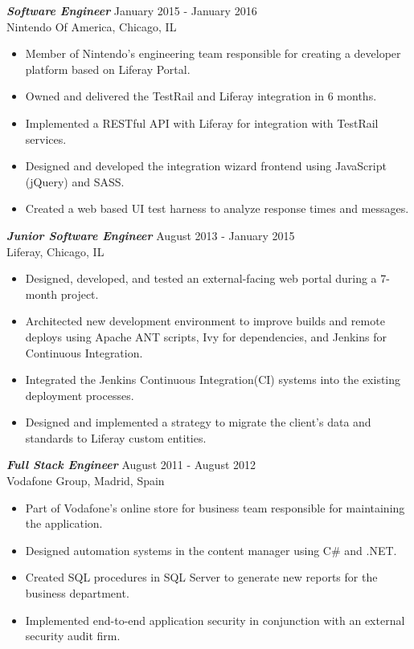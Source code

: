 \documentclass[overlapped, 10pt]{res} %
\begin{document}
\begin{resume}
{\sl \textbf{Software Engineer}} \hfill January 2015 - January 2016 \\
Nintendo Of America, Chicago, IL
\begin{itemize} \itemsep -1pt %
\item Member of Nintendo’s engineering team responsible for creating a developer platform based on Liferay Portal.
\item Owned and delivered the TestRail and Liferay integration in 6 months.
\item Implemented a RESTful API with Liferay for integration with TestRail services.
\item Designed and developed the integration wizard frontend using JavaScript (jQuery) and SASS.
\item Created a web based UI test harness to analyze response times and messages.
\end{itemize} 

{\sl \textbf{Junior Software Engineer}} \hfill August 2013 - January 2015 \\
Liferay, Chicago, IL
\begin{itemize} \itemsep -1pt %
\item Designed, developed, and tested an external-facing web portal during a 7-month project.
\item Architected new development environment to improve builds and remote deploys using Apache ANT scripts, Ivy for dependencies, and Jenkins for Continuous Integration.
\item Integrated the Jenkins Continuous Integration(CI) systems into the existing deployment processes.
\item Designed and implemented a strategy to migrate the client’s data and standards to Liferay custom entities.
\end{itemize} 

{\sl \textbf{Full Stack Engineer}} \hfill August 2011 - August 2012 \\
Vodafone Group, Madrid, Spain
\begin{itemize} \itemsep -1pt %
\item Part of Vodafone’s online store for business team responsible for maintaining the application.
\item Designed automation systems in the content manager using C\# and .NET.
\item Created SQL procedures in SQL Server to generate new reports for the business department.
\item Implemented end-to-end application security in conjunction with an external security audit firm.
\end{itemize} 


\end{resume}
\end{document}

